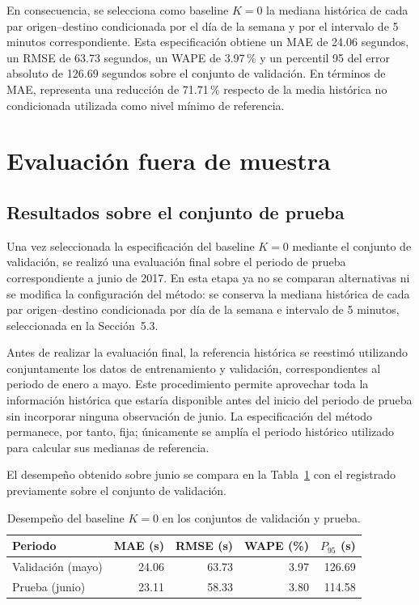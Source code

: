 \documentclass[11pt]{article}
\begin{document}
En consecuencia, se selecciona como baseline $K=0$ la mediana histórica de cada par origen--destino condicionada por el día de la semana y por el intervalo de 5 minutos correspondiente. Esta especificación obtiene un MAE de 24.06 segundos, un RMSE de 63.73 segundos, un WAPE de 3.97\,\% y un percentil 95 del error absoluto de 126.69 segundos sobre el conjunto de validación. En términos de MAE, representa una reducción de 71.71\,\% respecto de la media histórica no condicionada utilizada como nivel mínimo de referencia.

\section{Evaluación fuera de muestra}

\subsection{Resultados sobre el conjunto de prueba}

Una vez seleccionada la especificación del baseline $K=0$ mediante el conjunto de validación, se realizó una evaluación final sobre el periodo de prueba correspondiente a junio de 2017. En esta etapa ya no se comparan alternativas ni se modifica la configuración del método: se conserva la mediana histórica de cada par origen--destino condicionada por día de la semana e intervalo de 5 minutos, seleccionada en la Sección~5.3.

Antes de realizar la evaluación final, la referencia histórica se reestimó utilizando conjuntamente los datos de entrenamiento y validación, correspondientes al periodo de enero a mayo. Este procedimiento permite aprovechar toda la información histórica que estaría disponible antes del inicio del periodo de prueba sin incorporar ninguna observación de junio. La especificación del método permanece, por tanto, fija; únicamente se amplía el periodo histórico utilizado para calcular sus medianas de referencia.

El desempeño obtenido sobre junio se compara en la Tabla~\ref{tab:validacion_prueba} con el registrado previamente sobre el conjunto de validación.

\begin{table}[htbp]
\centering
\small
\caption{Desempeño del baseline $K=0$ en los conjuntos de validación y prueba.}
\label{tab:validacion_prueba}
\begin{tabular}{lrrrr}
\hline
\textbf{Periodo} &
\textbf{MAE (s)} &
\textbf{RMSE (s)} &
\textbf{WAPE (\%)} &
\textbf{$P_{95}$ (s)} \\
\hline
Validación (mayo) & 24.06 & 63.73 & 3.97 & 126.69 \\
Prueba (junio)    & 23.11 & 58.33 & 3.80 & 114.58 \\
\hline
\end{tabular}
\end{table}
\end{document}
